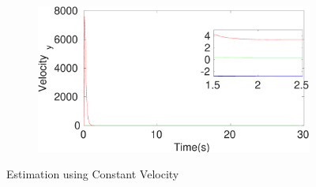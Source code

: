 \begin{figure}[h]
\begin{subfigure}{.5\linewidth}
\end{subfigure}
\begin{subfigure}{.5\linewidth}
\centering
\includegraphics[width=\linewidth]{figures/HInf/s3cvHInfVelocity_y}
\end{subfigure}
\caption{Estimation using Constant Velocity}
\end{figure}

